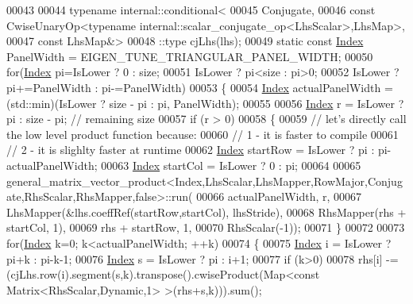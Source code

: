 \begin{DoxyCode}
00043 
00044     \textcolor{keyword}{typename} internal::conditional<
00045                           Conjugate,
00046                           \textcolor{keyword}{const} CwiseUnaryOp<typename internal::scalar\_conjugate\_op<LhsScalar>,LhsMap>,
00047                           \textcolor{keyword}{const} LhsMap&>
00048                         ::type cjLhs(lhs);
00049     \textcolor{keyword}{static} \textcolor{keyword}{const} \hyperlink{namespace_eigen_a62e77e0933482dafde8fe197d9a2cfde}{Index} PanelWidth = EIGEN\_TUNE\_TRIANGULAR\_PANEL\_WIDTH;
00050     \textcolor{keywordflow}{for}(\hyperlink{namespace_eigen_a62e77e0933482dafde8fe197d9a2cfde}{Index} pi=IsLower ? 0 : size;
00051         IsLower ? pi<size : pi>0;
00052         IsLower ? pi+=PanelWidth : pi-=PanelWidth)
00053     \{
00054       \hyperlink{namespace_eigen_a62e77e0933482dafde8fe197d9a2cfde}{Index} actualPanelWidth = (std::min)(IsLower ? size - pi : pi, PanelWidth);
00055 
00056       \hyperlink{namespace_eigen_a62e77e0933482dafde8fe197d9a2cfde}{Index} r = IsLower ? pi : size - pi; \textcolor{comment}{// remaining size}
00057       \textcolor{keywordflow}{if} (r > 0)
00058       \{
00059         \textcolor{comment}{// let's directly call the low level product function because:}
00060         \textcolor{comment}{// 1 - it is faster to compile}
00061         \textcolor{comment}{// 2 - it is slighlty faster at runtime}
00062         \hyperlink{namespace_eigen_a62e77e0933482dafde8fe197d9a2cfde}{Index} startRow = IsLower ? pi : pi-actualPanelWidth;
00063         \hyperlink{namespace_eigen_a62e77e0933482dafde8fe197d9a2cfde}{Index} startCol = IsLower ? 0 : pi;
00064 
00065         
      general\_matrix\_vector\_product<Index,LhsScalar,LhsMapper,RowMajor,Conjugate,RhsScalar,RhsMapper,false>::run(
00066           actualPanelWidth, r,
00067           LhsMapper(&lhs.coeffRef(startRow,startCol), lhsStride),
00068           RhsMapper(rhs + startCol, 1),
00069           rhs + startRow, 1,
00070           RhsScalar(-1));
00071       \}
00072 
00073       \textcolor{keywordflow}{for}(\hyperlink{namespace_eigen_a62e77e0933482dafde8fe197d9a2cfde}{Index} k=0; k<actualPanelWidth; ++k)
00074       \{
00075         \hyperlink{namespace_eigen_a62e77e0933482dafde8fe197d9a2cfde}{Index} i = IsLower ? pi+k : pi-k-1;
00076         \hyperlink{namespace_eigen_a62e77e0933482dafde8fe197d9a2cfde}{Index} s = IsLower ? pi   : i+1;
00077         \textcolor{keywordflow}{if} (k>0)
00078           rhs[i] -= (cjLhs.row(i).segment(s,k).transpose().cwiseProduct(Map<\textcolor{keyword}{const} 
      Matrix<RhsScalar,Dynamic,1> >(rhs+s,k))).sum();

\end{DoxyCode}
